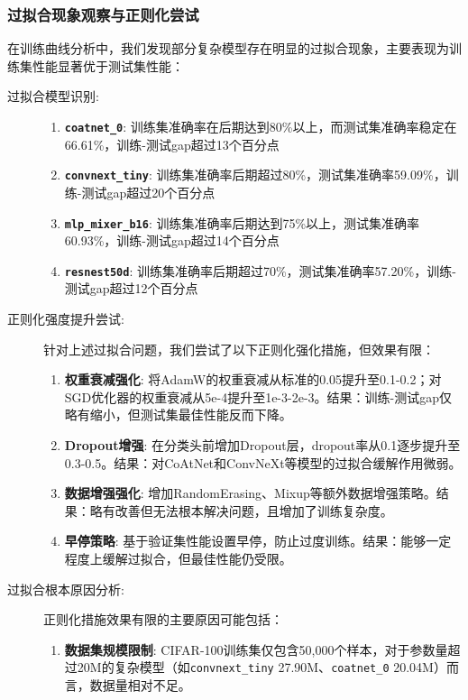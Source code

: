\documentclass[a4paper]{article}
\begin{document}
\begin{description}
\subsubsection{过拟合现象观察与正则化尝试}
在训练曲线分析中，我们发现部分复杂模型存在明显的过拟合现象，主要表现为训练集性能显著优于测试集性能：
\begin{description}
    \item[过拟合模型识别:]
    \begin{enumerate}
        \item \textbf{\texttt{coatnet\_0}}: 训练集准确率在后期达到80\%以上，而测试集准确率稳定在66.61\%，训练-测试gap超过13个百分点
        \item \textbf{\texttt{convnext\_tiny}}: 训练集准确率后期超过80\%，测试集准确率59.09\%，训练-测试gap超过20个百分点
        \item \textbf{\texttt{mlp\_mixer\_b16}}: 训练集准确率后期达到75\%以上，测试集准确率60.93\%，训练-测试gap超过14个百分点
        \item \textbf{\texttt{resnest50d}}: 训练集准确率后期超过70\%，测试集准确率57.20\%，训练-测试gap超过12个百分点
    \end{enumerate}
    \item[正则化强度提升尝试:] 针对上述过拟合问题，我们尝试了以下正则化强化措施，但效果有限：
    \begin{enumerate}
        \item \textbf{权重衰减强化}: 将AdamW的权重衰减从标准的0.05提升至0.1-0.2；对SGD优化器的权重衰减从5e-4提升至1e-3-2e-3。结果：训练-测试gap仅略有缩小，但测试集最佳性能反而下降。
        \item \textbf{Dropout增强}: 在分类头前增加Dropout层，dropout率从0.1逐步提升至0.3-0.5。结果：对CoAtNet和ConvNeXt等模型的过拟合缓解作用微弱。
        \item \textbf{数据增强强化}: 增加RandomErasing、Mixup等额外数据增强策略。结果：略有改善但无法根本解决问题，且增加了训练复杂度。
        \item \textbf{早停策略}: 基于验证集性能设置早停，防止过度训练。结果：能够一定程度上缓解过拟合，但最佳性能仍受限。
    \end{enumerate}
    \item[过拟合根本原因分析:] 正则化措施效果有限的主要原因可能包括：
    \begin{enumerate}
        \item \textbf{数据集规模限制}: CIFAR-100训练集仅包含50,000个样本，对于参数量超过20M的复杂模型（如\texttt{convnext\_tiny} 27.90M、\texttt{coatnet\_0} 20.04M）而言，数据量相对不足。

\end{enumerate}
\end{description}
\end{description}
\end{document}
